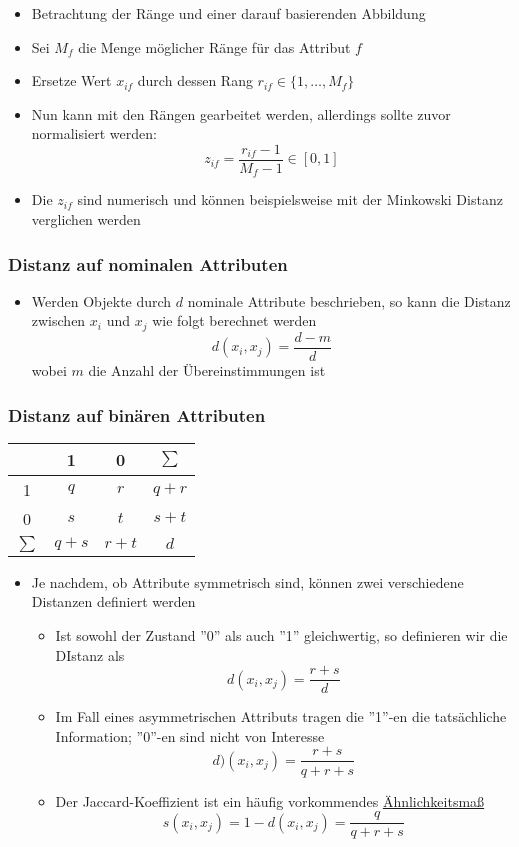 \documentclass{scrartcl}
\begin{document}
\begin{itemize}
	\item Betrachtung der Ränge und einer darauf basierenden Abbildung
	\item Sei $ M_f $ die Menge möglicher Ränge für das Attribut $ f $
	\item Ersetze Wert $ x_{if} $ durch dessen Rang $ r_{if} \in \{ 
	1,\ldots,M_f \} $
	\item Nun kann mit den Rängen gearbeitet werden, allerdings sollte zuvor 
	normalisiert werden:
	\[ z_{if} = \frac{r_{if} - 1}{M_f - 1} \in [0,1] \]
	\item Die $ z_{if} $ sind numerisch und können beispielsweise mit der 
	Minkowski Distanz verglichen werden
\end{itemize}

\subsubsection{Distanz auf nominalen Attributen}

\begin{itemize}
	\item Werden Objekte durch $ d $ nominale Attribute beschrieben, so kann 
	die Distanz zwischen $ x_i $ und $ x_j $ wie folgt berechnet werden
	\[ d(x_i,x_j) = \frac{d-m}{d} \]
	wobei $ m $ die Anzahl der Übereinstimmungen ist
\end{itemize}

\subsubsection{Distanz auf binären Attributen}

\begin{center}
	\begin{tabular}{|c|c|c|c|}
		\hline
		& 1 & 0 & $ \sum $ \\ 
		\hline
		1 & $ q $ & $ r $ & $ q+r $ \\ 
		\hline
		0 & $ s $ & $ t $ & $ s+t $ \\ 
		\hline
		$ \sum $ & $ q+s $ & $ r+t $ & $ d $ \\
		\hline
	\end{tabular} 
\end{center}

\begin{itemize}
	\item Je nachdem, ob Attribute symmetrisch sind, können zwei verschiedene 
	Distanzen definiert werden
	\begin{itemize}
		\item Ist sowohl der Zustand ''0'' als auch ''1'' gleichwertig, so 
		definieren wir die DIstanz als
		\[ d(x_i,x_j) = \frac{r+s}{d} \]
		\item Im Fall eines asymmetrischen Attributs tragen die ''1''-en die 
		tatsächliche Information; ''0''-en sind nicht von Interesse
		\[ d)(x_i,x_j) = \frac{r+s}{q+r+s} \]
		\item Der Jaccard-Koeffizient ist ein häufig vorkommendes 
		\underline{Ähnlichkeitsmaß}
		\[ s(x_i,x_j) = 1 - d(x_i,x_j) = \frac{q}{q+r+s} \]
	\end{itemize}
\end{itemize}
\end{document}
